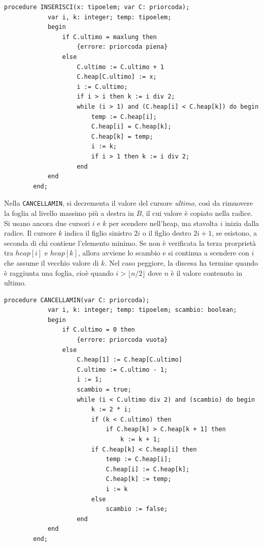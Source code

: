 \documentclass[12pt]{report}
\begin{document}
  	\begin{lstlisting}[style=pascalstyle]
  		procedure INSERISCI(x: tipoelem; var C: priorcoda);
  			var i, k: integer; temp: tipoelem;
  			begin
  				if C.ultimo = maxlung then
  					{errore: priorcoda piena}
  				else
  					C.ultimo := C.ultimo + 1
  					C.heap[C.ultimo] := x;
  					i := C.ultimo;
  					if i > i then k := i div 2;
  					while (i > 1) and (C.heap[i] < C.heap[k]) do begin
  						temp := C.heap[i];
  						C.heap[i] = C.heap[k];
  						C.heap[k] = temp;
  						i := k;
  						if i > 1 then k := i div 2;
  					end
  			end
  		end;
  	\end{lstlisting}
  	Nella \texttt{CANCELLAMIN}, si decrementa il valore del cursore \textit{ultimo}, così da rimuovere la foglia al livello massimo più a destra in $B$, il cui valore è copiato nella radice. Si usano ancora due cursori $i$ e $k$ per scendere nell'heap, ma stavolta $i$ inizia dalla radice. Il cursore $k$ indica il figlio sinistro $2i$ o il figlio destro $2i + 1$, se esistono, a seconda di chi contiene l'elemento minimo. Se non è verificata la terza prorprietà tra $heap[i]$ e $heap[k]$, allora avviene lo scambio e si continua a scendere con $i$ che assume il vecchio valore di $k$. Nel caso peggiore, la discesa ha termine quando è raggiunta una foglia, cioè quando $i > \lfloor n/2\rfloor$ dove $n$ è il valore contenuto in ultimo.
  	\begin{lstlisting}[style=pascalstyle]
  		procedure CANCELLAMIN(var C: priorcoda);
  			var i, k: integer; temp: tipoelem; scambio: boolean;
  			begin
  				if C.ultimo = 0 then
  					{errore: priorcoda vuota}
  				else
  					C.heap[1] := C.heap[C.ultimo]
  					C.ultimo := C.ultimo - 1;
  					i := 1;
  					scambio = true;
  					while (i < C.ultimo div 2) and (scambio) do begin
	  					k := 2 * i;
	  					if (k < C.ultimo) then
	  						if C.heap[k] > C.heap[k + 1] then
	  							k := k + 1;
	  					if C.heap[k] < C.heap[i] then
	  						temp := C.heap[i];
	  						C.heap[i] := C.heap[k];
	  						C.heap[k] := temp;
	  						i := k
	  					else
	  						scambio := false;
  					end
  			end
  		end;
  	\end{lstlisting}
\end{document}
